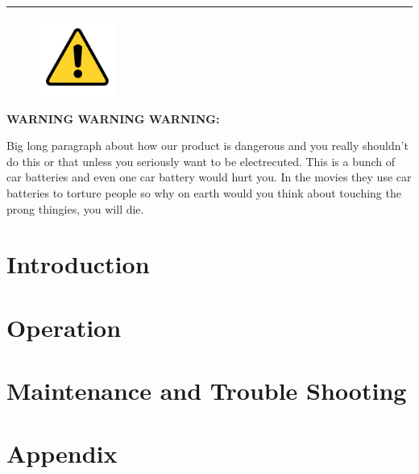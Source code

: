\documentclass[10pt]{article}
\begin{document}
\hrule

\begin{figure}
    \centering
    \includegraphics[width=1in]{warning_y}
\end{figure}

\vspace{5mm}

\noindent   
\Large{\textbf{WARNING WARNING WARNING:}} \\
\begin{large}                                        
	Big long paragraph about how our product is dangerous and you 
	really shouldn't do this or that unless you seriously want to be electrecuted. 
	This is a bunch of car batteries and even one car battery would hurt you. In 
	the movies they use car batteries to torture people so why on earth would 
	you think about touching the prong thingies, you will die.
\end{large}


\newpage
\tableofcontents

\newpage
{} %
\setcounter{page}{1}

\newpage
\section{Introduction}

 
\newpage
\section{Operation}


\newpage
\section{Maintenance and Trouble Shooting}


\newpage
\section{Appendix}

\end{document}
